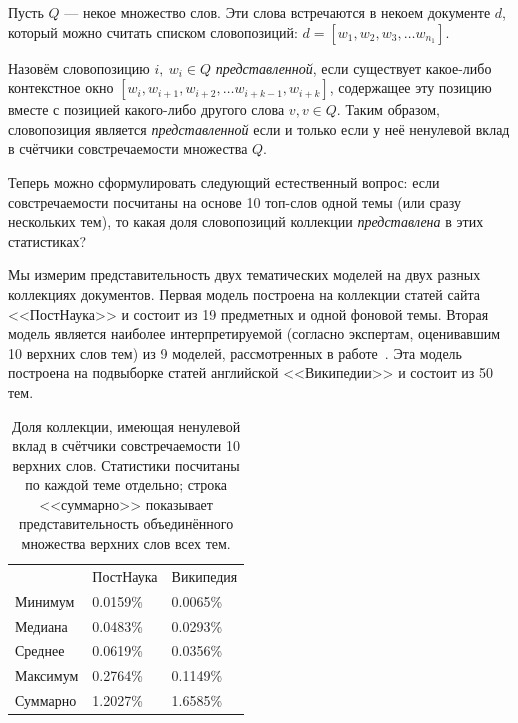 Пусть $Q$ --- некое множество слов. Эти слова встречаются в некоем документе $d$, который можно считать списком словопозиций: $d = [w_1, w_2, w_3, \dots w_{n_1}]$.

Назовём словопозицию $i, ~w_i \in Q$ \textit{представленной}, если существует какое-либо контекстное окно $[w_i, w_{i+1}, w_{i+2}, \dots w_{i+k-1}, w_{i+k}]$, содержащее эту позицию вместе с позицией какого-либо другого слова $v, v \in Q$. Таким образом, словопозиция является \textit{представленной} если и только если у неё ненулевой вклад в счётчики совстречаемости множества $Q$.

Теперь можно сформулировать следующий естественный вопрос: если совстречаемости посчитаны на основе 10 топ-слов одной темы (или сразу нескольких тем), то какая доля словопозиций коллекции \textit{представлена} в этих статистиках?




Мы измерим представительность двух тематических моделей на двух разных коллекциях документов. Первая модель построена на коллекции статей сайта <<ПостНаука>> и состоит из 19 предметных и одной фоновой темы. Вторая модель является наиболее интерпретируемой (согласно экспертам, оценивавшим 10 верхних слов тем) из 9 моделей, рассмотренных в работе~\cite{rtl}. Эта модель построена на подвыборке статей английской <<Википедии>> и состоит из 50 тем.

\begin{table}[ht]
\begin{tabular}{lll}
         & ПостНаука & Википедия \\
Минимум  & 0.0159\%  & 0.0065\%  \\
Медиана  & 0.0483\%  & 0.0293\%  \\
Среднее  & 0.0619\%  & 0.0356\%  \\
Максимум & 0.2764\%  & 0.1149\%  \\
Суммарно & 1.2027\%  & 1.6585\%
\end{tabular}
    \caption{
      Доля коллекции, имеющая ненулевой вклад в счётчики совстречаемости 10 верхних слов. Статистики посчитаны по каждой теме отдельно; строка <<суммарно>> показывает представительность объединённого множества верхних слов всех тем.
    }
    \label{table:represented}
\end{table}

